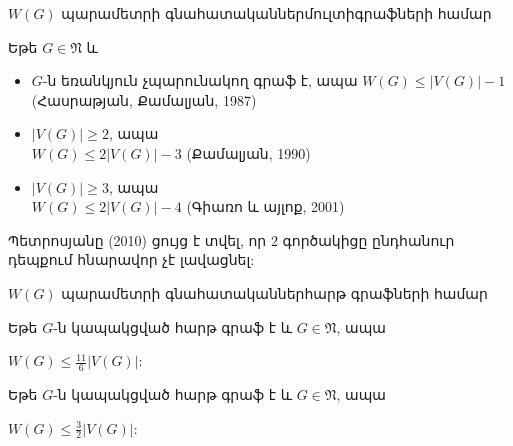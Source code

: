 \begin{frame}{$W(G)$ պարամետրի գնահատականներ}{մուլտիգրաֆների համար}

Եթե $G \in \mathfrak{N}$ և
\begin{itemize}
\item $G$-ն եռանկյուն չպարունակող գրաֆ է, ապա $W(G)\leq \vert V(G)\vert -1$ (Հասրաթյան, Քամալյան, 1987)
\item $|V(G)|\geq 2$, ապա\\ $W(G)\leq 2|V(G)|-3$ (Քամալյան, 1990)
\item $|V(G)|\geq 3$, ապա\\ $W(G)\leq 2|V(G)|-4$ (Գիառո և այլոք, 2001)
\end{itemize}

Պետրոսյանը (2010) ցույց է տվել, որ $2$ գործակիցը ընդհանուր դեպքում հնարավոր չէ լավացնել:

\end{frame}

\begin{frame}{$W(G)$ պարամետրի գնահատականներ}{հարթ գրաֆների համար}
 
\begin{theorem}[Աքսենովիչ, 2002]
Եթե $G$-ն կապակցված հարթ գրաֆ է և $G \in \mathfrak{N}$, ապա 
\begin{center}
$W(G) \leq \frac{11}{6}|V(G)|$:
\end{center}
\end{theorem}

\pause
\begin{hypothesis}[Աքսենովիչ, 2002]
Եթե $G$-ն կապակցված հարթ գրաֆ է և $G \in \mathfrak{N}$, ապա 
\begin{center}
$W(G) \leq \frac{3}{2}|V(G)|$:
\end{center}
\end{hypothesis}
\end{frame}

